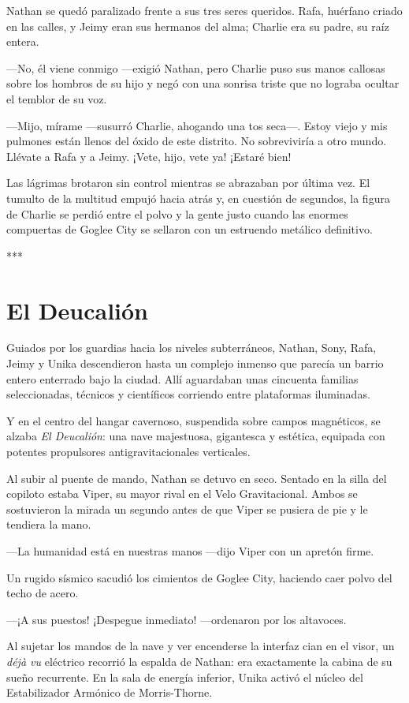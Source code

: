 \documentclass[12pt,a4paper]{book}
\begin{document}
Nathan se quedó paralizado frente a sus tres seres queridos. Rafa, huérfano criado en las calles, y Jeimy eran sus hermanos del alma; Charlie era su padre, su raíz entera.

---No, él viene conmigo ---exigió Nathan, pero Charlie puso sus manos callosas sobre los hombros de su hijo y negó con una sonrisa triste que no lograba ocultar el temblor de su voz.

---Mijo, mírame ---susurró Charlie, ahogando una tos seca---. Estoy viejo y mis pulmones están llenos del óxido de este distrito. No sobreviviría a otro mundo. Llévate a Rafa y a Jeimy. ¡Vete, hijo, vete ya! ¡Estaré bien!

Las lágrimas brotaron sin control mientras se abrazaban por última vez. El tumulto de la multitud empujó hacia atrás y, en cuestión de segundos, la figura de Charlie se perdió entre el polvo y la gente justo cuando las enormes compuertas de Goglee City se sellaron con un estruendo metálico definitivo.

***

\section*{El Deucalión}

Guiados por los guardias hacia los niveles subterráneos, Nathan, Sony, Rafa, Jeimy y Unika descendieron hasta un complejo inmenso que parecía un barrio entero enterrado bajo la ciudad. Allí aguardaban unas cincuenta familias seleccionadas, técnicos y científicos corriendo entre plataformas iluminadas.

Y en el centro del hangar cavernoso, suspendida sobre campos magnéticos, se alzaba \textit{El Deucalión}: una nave majestuosa, gigantesca y estética, equipada con potentes propulsores antigravitacionales verticales.

Al subir al puente de mando, Nathan se detuvo en seco. Sentado en la silla del copiloto estaba Viper, su mayor rival en el Velo Gravitacional. Ambos se sostuvieron la mirada un segundo antes de que Viper se pusiera de pie y le tendiera la mano.

---La humanidad está en nuestras manos ---dijo Viper con un apretón firme.

Un rugido sísmico sacudió los cimientos de Goglee City, haciendo caer polvo del techo de acero.

---¡A sus puestos! ¡Despegue inmediato! ---ordenaron por los altavoces.

Al sujetar los mandos de la nave y ver encenderse la interfaz cian en el visor, un \textit{déjà vu} eléctrico recorrió la espalda de Nathan: era exactamente la cabina de su sueño recurrente. En la sala de energía inferior, Unika activó el núcleo del Estabilizador Armónico de Morris-Thorne.
\end{document}
